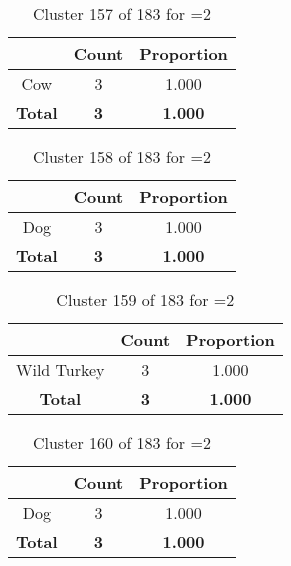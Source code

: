 \begin{table}[ht!]
\centering
\begin{tabular}{|c|c|c|}
\hline
\bf \Spec{} &\bf Count &\bf Proportion\\ \hline \hline
Cow & 3 & 1.000\\ \hline
\hline
\bf Total & \bf 3 & \bf 1.000\\ \hline
\end{tabular}
\label{tab:cluster:157:2}
\caption{Cluster 157 of 183 for \minneigh{}=2}
\end{table}

\begin{table}[ht!]
\centering
\begin{tabular}{|c|c|c|}
\hline
\bf \Spec{} &\bf Count &\bf Proportion\\ \hline \hline
Dog & 3 & 1.000\\ \hline
\hline
\bf Total & \bf 3 & \bf 1.000\\ \hline
\end{tabular}
\label{tab:cluster:158:2}
\caption{Cluster 158 of 183 for \minneigh{}=2}
\end{table}

\begin{table}[ht!]
\centering
\begin{tabular}{|c|c|c|}
\hline
\bf \Spec{} &\bf Count &\bf Proportion\\ \hline \hline
Wild Turkey & 3 & 1.000\\ \hline
\hline
\bf Total & \bf 3 & \bf 1.000\\ \hline
\end{tabular}
\label{tab:cluster:159:2}
\caption{Cluster 159 of 183 for \minneigh{}=2}
\end{table}

\clearpage
\begin{table}[ht!]
\centering
\begin{tabular}{|c|c|c|}
\hline
\bf \Spec{} &\bf Count &\bf Proportion\\ \hline \hline
Dog & 3 & 1.000\\ \hline
\hline
\bf Total & \bf 3 & \bf 1.000\\ \hline
\end{tabular}
\label{tab:cluster:160:2}
\caption{Cluster 160 of 183 for \minneigh{}=2}
\end{table}

